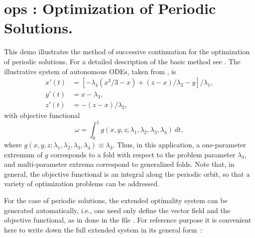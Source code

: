 \documentclass[12pt]{report}
\begin{document}
\newpage
\section{ ops : Optimization of Periodic Solutions.} \label{sec:Demos_ops}
This demo illustrates the method of successive continuation
for the optimization of periodic solutions.
For a detailed description of the basic method see
 \citeyear{DoKeKe:91b}.
The illustrative system of autonomous ODEs, taken from 
 \citeyear{Alej:91}, is
\begin{equation} \begin{array}{cl}
  x'(t) & = [-\lambda_4(x^3/3-x) + (z-x)/\lambda_2 - y]/\lambda_1, \\
  y'(t) &= x-\lambda_3, \\
  z'(t) &= -(z-x)/\lambda_2,
\end{array} \end{equation}
with objective functional
$$ \omega = 
  \int_0^{1} g(x,y,z;\lambda_1,\lambda_2,\lambda_3,\lambda_4) ~ dt, $$
where $g(x,y,z;\lambda_1,\lambda_2,\lambda_3,\lambda_4) \equiv \lambda_3$.
Thus, in this application, a one-parameter extremum of $g$ corresponds
to a fold with respect to the problem parameter $\lambda_3$, 
and multi-parameter extrema correspond to generalized folds.
Note that, in general, the objective functional is an integral along 
the periodic orbit, so that a variety of optimization problems
can be addressed.

For the case of periodic solutions, the extended optimality system
can be generated automatically, i.e., one need only define the vector field 
and the objective functional, as in done in the file .
For reference purpose it is convenient here to write down
the full extended system in its general form~:
\end{document}
